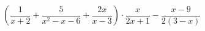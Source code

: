\begin{ex}[type=expression]
	\begin{condition}
		\( \left( \dfrac{1}{x+2}+\dfrac{5}{x^2-x-6}+\dfrac{2x}{x-3} \right)\cdot\dfrac{x}{2x+1}-\dfrac{x-9}{2(3-x)} \)
	\end{condition}
\end{ex}
